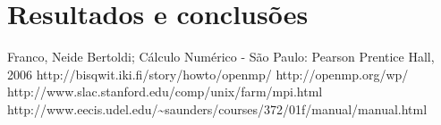 \documentclass[a4paper]{article}
\begin{document}
\section{Resultados e conclusões}

\begin{thebibliography}{99}
	 Franco, Neide Bertoldi; Cálculo Numérico - São Paulo: Pearson Prentice Hall, 2006
	 http://bisqwit.iki.fi/story/howto/openmp/
	 http://openmp.org/wp/
	 http://www.slac.stanford.edu/comp/unix/farm/mpi.html
	 http://www.eecis.udel.edu/\~{}saunders/courses/372/01f/manual/manual.html
\end{thebibliography}
\end{document}
